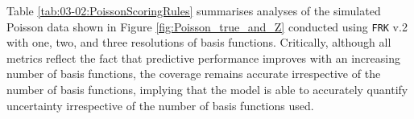\documentclass[12pt,a4paper]{article}
\begin{document}

  
Table \ref{tab:03-02:PoissonScoringRules} summarises analyses of the simulated Poisson data shown in Figure \ref{fig:Poisson_true_and_Z} conducted using \texttt{FRK} v.2 with one, two, and three resolutions of basis functions. 
Critically, although all metrics reflect the fact that predictive performance improves with an increasing number of basis functions, the coverage remains accurate irrespective of the number of basis functions, implying that the model is able to accurately quantify uncertainty irrespective of the number of basis functions used. 
\end{document}
